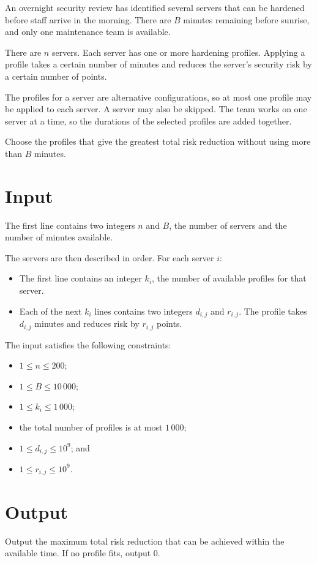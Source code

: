 
An overnight security review has identified several servers that can be
hardened before staff arrive in the morning. There are $B$ minutes remaining
before sunrise, and only one maintenance team is available.

There are $n$ servers. Each server has one or more hardening profiles. Applying
a profile takes a certain number of minutes and reduces the server's security
risk by a certain number of points.

The profiles for a server are alternative configurations, so at most one
profile may be applied to each server. A server may also be skipped. The team
works on one server at a time, so the durations of the selected profiles are
added together.

Choose the profiles that give the greatest total risk reduction without using
more than $B$ minutes.

\section*{Input}

The first line contains two integers $n$ and $B$, the number of servers and the
number of minutes available.

The servers are then described in order. For each server $i$:

\begin{itemize}
    \item The first line contains an integer $k_i$, the number of available
          profiles for that server.
    \item Each of the next $k_i$ lines contains two integers $d_{i,j}$ and
          $r_{i,j}$. The profile takes $d_{i,j}$ minutes and reduces risk by
          $r_{i,j}$ points.
\end{itemize}

The input satisfies the following constraints:

\begin{itemize}
    \item $1 \le n \le 200$;
    \item $1 \le B \le 10\,000$;
    \item $1 \le k_i \le 1\,000$;
    \item the total number of profiles is at most $1\,000$;
    \item $1 \le d_{i,j} \le 10^9$; and
    \item $1 \le r_{i,j} \le 10^9$.
\end{itemize}

\section*{Output}

Output the maximum total risk reduction that can be achieved within the
available time. If no profile fits, output $0$.

